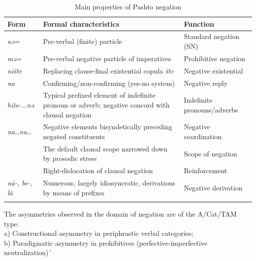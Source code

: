 \documentclass[output=paper,colorlinks,citecolor=brown]{langscibook}
\begin{document}
\begin{table}[t]
\begin{tabularx}{\textwidth}{lQl}
\lsptoprule
Form & Formal characteristics & Function\\
\midrule 
  {\itshape nə=} & Pre-verbal (finite) particle & Standard negation (SN)\\
\tablevspace
{\itshape mə=} & Pre-verbal negative particle of imperatives &  Prohibitive negation\\
\tablevspace
 \textit{nište} & Replacing clause-final existential copula \textit{šte} & Negative existential \\
\tablevspace
 {\itshape na} & Confirming/non-confirming (yes-no system) & Negative reply\\
\tablevspace
 \textit{hīts{}-...nə} & Typical prefixed element of indefinite pronoun or adverb; negative concord with clausal negation & Indefinite pronouns/adverbs\\
\tablevspace
  \textit{na…na…} & Negative elements bisyndetically preceding negated constituents & Negative coordination\\
  \tablevspace
& The default clausal scope narrowed down by prosodic stress & Scope of negation \\
\tablevspace
  & Right-dislocation of clausal negation & Reinforcement\\
\tablevspace
 \textit{nā-, be-, lā} & Numerous, largely idiosyncratic, derivations by means of prefixes & Negative derivation\\
\lspbottomrule
\end{tabularx}
\parbox{\textwidth}{\raggedright\footnotesize
 {The asymmetries observed in the domain of negation are of the  A/Cat/TAM type:} \\
 {a) Constructional asymmetry in periphrastic verbal categories;} \\
 {b) Paradigmatic asymmetry in prohibitives (perfective-imperfective neutralization)}´
 }
\caption{Main properties of Pashto negation}
\label{tab:pas:3}
\end{table}
\end{document}
